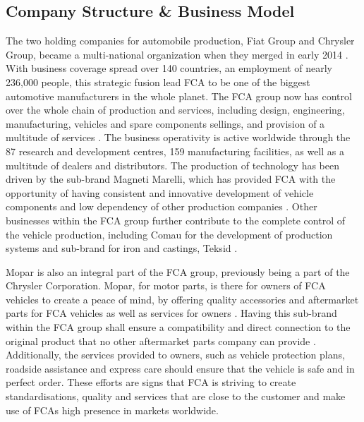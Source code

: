 \subsection{Company Structure & Business Model}
The two holding companies for automobile production, Fiat Group and Chrysler Group, became a multi-national organization when they merged in early 2014 \cite{fca_history}. With business coverage spread over 140 countries, an employment of nearly 236,000 people, this strategic fusion lead FCA to be one of the biggest automotive manufacturers in the whole planet. The FCA group now has control over the whole chain of production and services, including design, engineering, manufacturing, vehicles and spare components sellings, and provision of a multitude of services \cite{fca_overview}. The business operativity is active worldwide through the 87 research and development centres, 159 manufacturing facilities, as well as a multitude of dealers and distributors. The production of technology has been driven by the sub-brand Magneti Marelli, which has provided FCA with the opportunity of having consistent and innovative development of vehicle components and low dependency of other production companies \cite{magneti_marelli}. Other businesses within the FCA group further contribute to the complete control of the vehicle production, including Comau for the development of production systems and sub-brand for iron and castings, Teksid \cite{fca_overview}.\n 

Mopar is also an integral part of the FCA group, previously being a part of the Chrysler Corporation. Mopar, for motor parts, is there for owners of FCA vehicles to create a peace of mind, by offering quality accessories and aftermarket parts for FCA vehicles as well as services for owners \cite{fca_mopar}. Having this sub-brand within the FCA group shall ensure a compatibility and direct connection to the original product that no other aftermarket parts company can provide \cite{fca_mopar}. Additionally, the services provided to owners, such as vehicle protection plans, roadside assistance and express care should ensure that the vehicle is safe and in perfect order. These efforts are signs that FCA is striving to create standardisations, quality and services that are close to the customer and make use of FCAs high presence in markets worldwide. 
 
